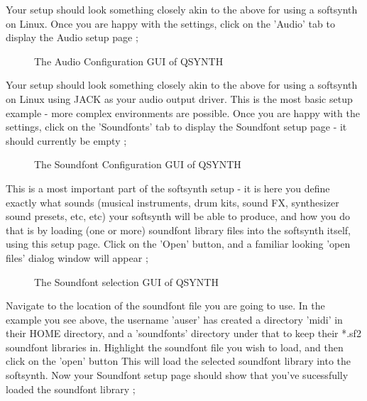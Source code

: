\documentclass[letterpaper]{report}
\begin{document}
Your setup should look something closely akin to the above for using
a softsynth on Linux. Once you are happy with the settings, click on
the 'Audio' tab to display the Audio setup page ;



\begin{figure}%
%
%
\caption{The Audio Configuration GUI of QSYNTH}%
\end{figure}%



Your setup should look something closely akin to the above for using
a softsynth on Linux using JACK as your audio output driver. This is
the most basic setup example - more complex environments are possible.
Once you are happy with the settings, click on the 'Soundfonts' tab to
display the Soundfont setup page - it should currently be empty ;


\begin{figure}%
%
%
\caption{The Soundfont Configuration GUI of QSYNTH}%
\end{figure}%



This is a most important part of the softsynth setup - it is here you
define exactly what sounds (musical instruments, drum kits, sound FX,
synthesizer sound presets, etc, etc) your softsynth will be able to produce,
and how you do that is by loading (one or more) soundfont library files
into the softsynth itself, using this setup page. Click on the 'Open'
button, and a familiar looking 'open files' dialog window will appear ;



\begin{figure}%
%
%
\caption{The Soundfont selection GUI of QSYNTH}%
\end{figure}%


Navigate to the location of the soundfont file you are going to use.
In the example you see above, the username 'auser' has created a
directory 'midi' in their HOME directory, and a 'soundfonts' directory
under that to keep their *.sf2 soundfont libraries in. Highlight the
soundfont file you wish to load, and then click on the 'open' button
This will load the selected soundfont library into the softsynth. Now
your Soundfont setup page should show that you've sucessfully loaded 
the soundfont library ;
\end{document}
